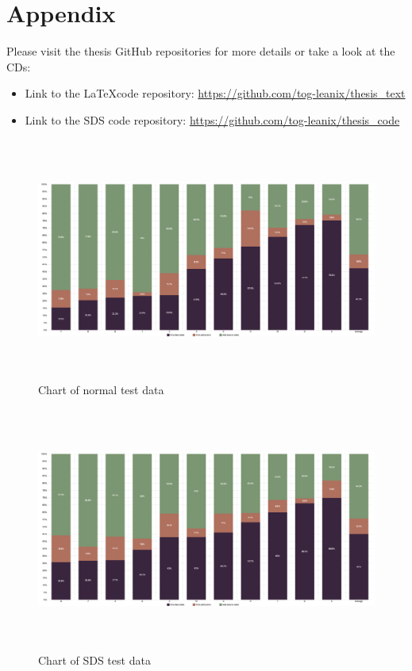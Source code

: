 \section*{Appendix}
Please visit the thesis GitHub repositories for more details or take a look at the CDs: \\
\begin{itemize}
    \item Link to the \LaTeX code repository: \url{https://github.com/tog-leanix/thesis_text}
    \item Link to the \acl{SDS} code repository: \url{https://github.com/tog-leanix/thesis_code}
\end{itemize}



\begin{figure}
    \centerline{
    \includegraphics[height=8cm]{images/normal_test_data_chart.png}}
\caption{Chart of normal test data}
\end{figure}
\begin{figure}
    \centerline{
    \includegraphics[height=8cm]{images/sds_test_data_chart.png}}
\caption{Chart of \ac{SDS} test data}
\end{figure}
